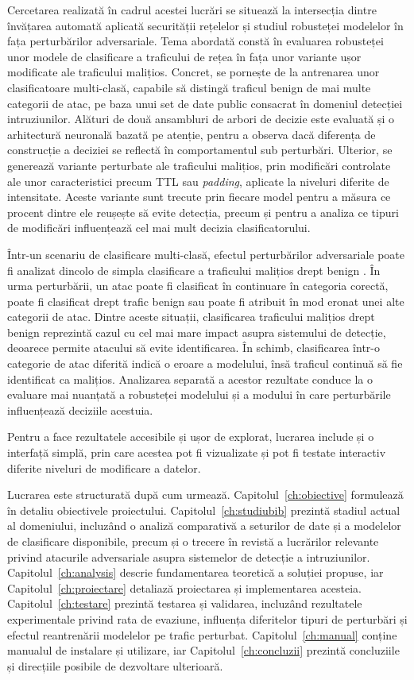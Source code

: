 Cercetarea realizată în cadrul acestei lucrări se situează la intersecția dintre învă\-ța\-rea automată aplicată securității rețelelor și studiul robusteței modelelor în fața perturbărilor adversariale. Tema abordată constă în evaluarea robusteței unor modele de clasificare a traficului de rețea în fața unor variante ușor modificate ale traficului malițios. Concret, se pornește de la antrenarea unor clasificatoare multi-clasă, capabile să distingă traficul benign de mai multe categorii de atac, pe baza unui set de date public consacrat în domeniul detecției intruziunilor. Alături de două ansambluri de arbori de decizie este evaluată și o arhitectură neuronală bazată pe atenție, pentru a observa dacă diferența de construcție a deciziei se reflectă în comportamentul sub perturbări. Ulterior, se generează variante perturbate ale traficului malițios, prin modificări controlate ale unor caracteristici precum TTL sau \textit{padding}, aplicate la niveluri diferite de intensitate. Aceste variante sunt trecute prin fiecare model pentru a măsura ce procent dintre ele reușește să evite detecția, precum și pentru a analiza ce tipuri de modificări influențează cel mai mult decizia clasificatorului.

Într-un scenariu de clasificare multi-clasă, efectul perturbărilor adversariale poate fi analizat dincolo de simpla clasificare a traficului malițios drept benign \cite{he2023adversarial}. În urma perturbării, un atac poate fi clasificat în continuare în categoria corectă, poate fi clasificat drept trafic benign sau poate fi atribuit în mod eronat unei alte categorii de atac. Dintre aceste situații, clasificarea traficului malițios drept benign reprezintă cazul cu cel mai mare impact asupra sistemului de detecție, deoarece permite atacului să evite identificarea. În schimb, clasificarea într-o categorie de atac diferită indică o eroare a modelului, însă traficul continuă să fie identificat ca malițios. Analizarea separată a acestor rezultate conduce la o evaluare mai nuanțată a robusteței modelului și a modului în care perturbările influențează deciziile acestuia.

Pentru a face rezultatele accesibile și ușor de explorat, lucrarea include și o interfață simplă, prin care acestea pot fi vizualizate și pot fi testate interactiv diferite niveluri de modificare a datelor.

Lucrarea este structurată după cum urmează. Capitolul~\ref{ch:obiective} formulează în detaliu obiectivele proiectului. Capitolul~\ref{ch:studiubib} prezintă stadiul actual al domeniului, incluzând o analiză comparativă a seturilor de date și a modelelor de clasificare disponibile, precum și o trecere în revistă a lucrărilor relevante privind atacurile adversariale asupra sistemelor de detecție a intruziunilor. Capitolul~\ref{ch:analysis} descrie fundamentarea teoretică a soluției propuse, iar Capitolul~\ref{ch:proiectare} detaliază proiectarea și implementarea acesteia. Capitolul~\ref{ch:testare} prezintă testarea și validarea, incluzând rezultatele experimentale privind rata de evaziune, influența diferitelor tipuri de perturbări și efectul reantrenării modelelor pe trafic perturbat. Capitolul~\ref{ch:manual} conține manualul de instalare și utilizare, iar Capitolul~\ref{ch:concluzii} prezintă concluziile și direcțiile posibile de dezvoltare ulterioară.